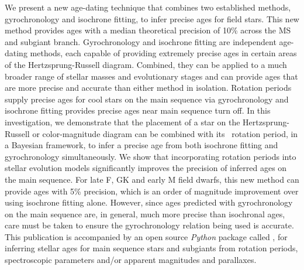 We present a new age-dating technique that combines two established methods,
gyrochronology and isochrone fitting, to infer precise ages for field stars.
This new method provides ages with a median theoretical precision of 10\%
across the MS and subgiant branch.
Gyrochronology and isochrone fitting are independent age-dating methods, each
capable of providing extremely precise ages in certain areas of the
Hertzsprung-Russell diagram.
Combined, they can be applied to a much broader range of stellar masses and
evolutionary stages and can provide ages that are more precise and accurate
than either method in isolation.
Rotation periods supply precise ages for cool stars on the main sequence via
gyrochronology and isochrone fitting provides precise ages near main sequence
turn off.
In this investigation, we demonstrate that the placement of a star on the
Hertzsprung-Russell or color-magnitude diagram
can be combined with its \kepler\ rotation period, in a Bayesian framework, to
infer a precise age from both isochrone fitting and gyrochronology
simultaneously.
We show that incorporating rotation periods into stellar evolution models
significantly improves the precision of inferred ages on the main sequence.
For late F, GK and early M field dwarfs, this new method can provide ages with
5\% precision, which is an order of magnitude improvement over using isochrone
fitting alone.
However, since ages predicted with gyrochronology on the main sequence are, in
general, much more precise than isochronal ages, care must be taken to ensure
the gyrochronology relation being used is accurate.
This publication is accompanied by an open source {\it Python} package called
\sd, for inferring stellar ages for main sequence stars and subgiants from
rotation periods, spectroscopic parameters and/or apparent magnitudes and
parallaxes.

